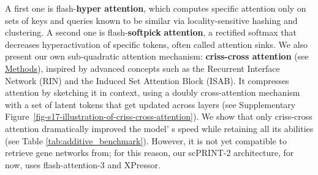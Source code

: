 A first one is flash-\textbf{hyper attention}, which computes specific
attention only on sets of keys and queries known to be similar via
locality-sensitive hashing and clustering\citep{hanHyperAttentionLongcontextAttention2023}. A second
one is flash-\textbf{softpick} \textbf{attention}, a rectified softmax
that decreases hyperactivation of specific tokens, often called
attention sinks\citep{zuhriSoftpickNoAttention2025}. We also present our own
sub-quadratic attention mechanism: \textbf{criss-cross attention} (see \hyperref[methods]{Methods}),
inspired by advanced concepts such as the Recurrent Interface Network
(RIN) and the Induced Set Attention Block (ISAB)\citep{leeSetTransformerFramework2019,jabriScalableAdaptiveComputation2023}.
It compresses attention by sketching it in context, using a doubly
cross-attention mechanism with a set of latent tokens that get updated
across layers (see Supplementary Figure~\ref{fig-s17-illustration-of-criss-cross-attention}). We show that only criss-cross
attention dramatically improved the model' s speed while
retaining all its abilities (see Table \ref{tab:additive_benchmark}). However, it is not yet
compatible to retrieve gene networks from; for this reason, our
\gls{scPRINT}-2 architecture, for now, uses flash-attention-3 and XPressor.

